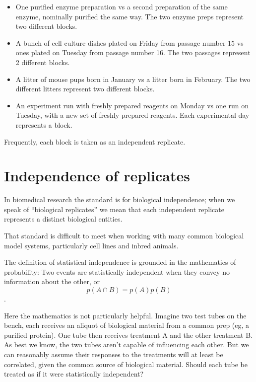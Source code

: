 \documentclass[]{book}
\providecommand{\tightlist}{%
  \setlength{\itemsep}{0pt}\setlength{\parskip}{0pt}}
\begin{document}
\begin{itemize}
\tightlist
\item
  One purified enzyme preparation vs a second preparation of the same enzyme, nominally purified the same way. The two enzyme preps represent two different blocks.
\item
  A bunch of cell culture dishes plated on Friday from passage number 15 vs ones plated on Tuesday from passage number 16. The two passages represent 2 different blocks.
\item
  A litter of mouse pups born in January vs a litter born in February. The two different litters represent two different blocks.
\item
  An experiment run with freshly prepared reagents on Monday vs one run on Tuesday, with a new set of freshly prepared reagents. Each experimental day represents a block.
\end{itemize}

Frequently, each block is taken as an independent replicate.

\hypertarget{independence-of-replicates}{%
\section{Independence of replicates}\label{independence-of-replicates}}

In biomedical research the standard is for biological independence; when we speak of ``biological replicates'' we mean that each independent replicate represents a distinct biological entities.

That standard is difficult to meet when working with many common biological model systems, particularly cell lines and inbred animals.

The definition of statistical independence is grounded in the mathematics of probability: Two events are statistically independent when they convey no information about the other, or \[p(A \cap B)=p(A)p(B)\].

Here the mathematics is not particularly helpful. Imagine two test tubes on the bench, each receives an aliquot of biological material from a common prep (eg, a purified protein). One tube then receives treatment A and the other treatment B. As best we know, the two tubes aren't capable of influencing each other. But we can reasonably assume their responses to the treatments will at least be correlated, given the common source of biological material. Should each tube be treated as if it were statistically independent?
\end{document}
